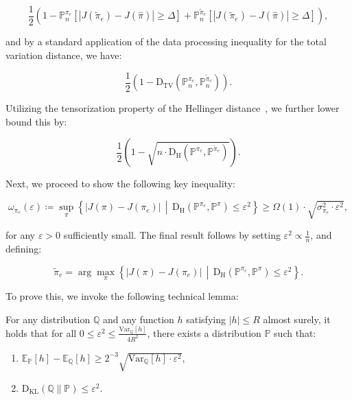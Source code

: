 \[
\frac{1}{2} \left(
1 - \mathbb{P}_n^{\pi_e}\left[\left|J(\tilde{\pi}_e) - J(\hat{\pi})\right| \geq \Delta\right] +
\mathbb{P}_n^{\tilde{\pi}_e}\left[\left|J(\tilde{\pi}_e) - J(\hat{\pi})\right| \geq \Delta\right]
\right),
\]

and by a standard application of the data processing inequality for the total variation distance, we have:

\[
\frac{1}{2} \left(1 - \mathrm{D}_{\text{TV}}\left(\mathbb{P}_n^{\pi_e}, \mathbb{P}_n^{\tilde{\pi}_e}\right)\right).
\]

Utilizing the tensorization property of the Hellinger distance~\cite{wainwright2019high}, we further lower bound this by:

\[
\frac{1}{2} \left(1 - \sqrt{n \cdot \mathrm{D}_{\text{H}}\left(\mathbb{P}^{\pi_e}, \mathbb{P}^{\tilde{\pi}_e}\right)}\right).
\]

Next, we proceed to show the following key inequality:

\[
\omega_{\pi_e}(\varepsilon) \coloneqq \sup_{\pi} \left\{\left|J(\pi) - J(\pi_e)\right| \, \middle| \, \mathrm{D}_{\text{H}}\left(\mathbb{P}^{\pi_e}, \mathbb{P}^\pi\right) \leq \varepsilon^2\right\}
\geq \Omega(1) \cdot \sqrt{\sigma_{\pi_e}^2 \cdot \varepsilon^2},
\]

for any \(\varepsilon > 0\) sufficiently small. The final result follows by setting \(\varepsilon^2 \propto \frac{1}{n}\), and defining:

\[
\tilde{\pi}_e = \arg\max_{\pi} \left\{\left|J(\pi) - J(\pi_e)\right| \, \middle| \, \mathrm{D}_{\text{H}}\left(\mathbb{P}^{\pi_e}, \mathbb{P}^\pi\right) \leq \varepsilon^2\right\}.
\]

To prove this, we invoke the following technical lemma:

\begin{lemma}
\label{lem:kl_dual}
For any distribution \(\mathbb{Q}\) and any function \(h\) satisfying \(\left|h\right| \leq R\) almost surely, it holds that for all \(0 \leq \varepsilon^2 \leq \frac{\mathrm{Var}_{\mathbb{Q}}[h]}{4R^2}\), there exists a distribution \(\mathbb{P}\) such that:
\begin{enumerate}
    \item \(\mathbb{E}_{\mathbb{P}}[h] - \mathbb{E}_{\mathbb{Q}}[h] \geq 2^{-3} \sqrt{\mathrm{Var}_{\mathbb{Q}}[h] \cdot \varepsilon^2}\),
    \item \(\mathrm{D}_{\text{KL}}(\mathbb{Q} \| \mathbb{P}) \leq \varepsilon^2\).
\end{enumerate}
\end{lemma}


